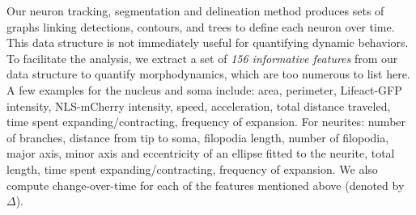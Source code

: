 \vspace{-3mm} Our neuron tracking, segmentation
and delineation method produces sets of graphs
linking detections, contours, and trees to define
each neuron over time.  This data structure is not
immediately useful for quantifying dynamic
behaviors.  To facilitate the analysis, we extract
a set of {\em 156 informative features} from our
data structure to quantify morphodynamics, which
are too numerous to list here.  A few examples for
the nucleus and soma include: area, perimeter,
Lifeact-GFP intensity, NLS-mCherry intensity,
speed, acceleration, total distance traveled, time
spent expanding/contracting, frequency of
expansion.  For neurites: number of branches,
distance from tip to soma, filopodia length,
number of filopodia, major axis, minor axis and
eccentricity of an ellipse fitted to the neurite,
total length, time spent expanding/contracting,
frequency of expansion. We also compute
change-over-time for each of the features
mentioned above (denoted by $\Delta$).

